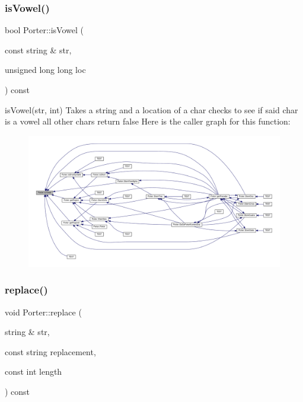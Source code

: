\subsubsection{\texorpdfstring{is\+Vowel()}{isVowel()}}
{\footnotesize\ttfamily bool Porter\+::is\+Vowel (\begin{DoxyParamCaption}\item[{const string \&}]{str,  }\item[{unsigned long long}]{loc }\end{DoxyParamCaption}) const}

is\+Vowel(str, int) Takes a string and a location of a char checks to see if said char is a vowel all other chars return false Here is the caller graph for this function\+:
\nopagebreak
\begin{figure}[H]
\begin{center}
\leavevmode
\includegraphics[width=350pt]{class_porter_ab16d2762c47b86b9a161be3d2c44203e_icgraph}
\end{center}
\end{figure}
\mbox{\label{class_porter_aba12641d0e612b264097a35e4f2ffb45}} 
\subsubsection{\texorpdfstring{replace()}{replace()}}
{\footnotesize\ttfamily void Porter\+::replace (\begin{DoxyParamCaption}\item[{string \&}]{str,  }\item[{const string}]{replacement,  }\item[{const int}]{length }\end{DoxyParamCaption}) const}

